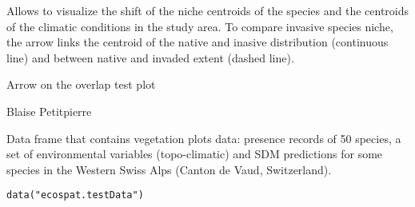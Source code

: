 \documentclass[a4paper]{book}
\begin{document}
%
\begin{Details}\relax
Allows to visualize the shift of the niche centroids of the species and the centroids of the climatic conditions in the study area. To compare invasive species niche, the arrow links the centroid of the native and inasive distribution (continuous line) and between native and invaded extent (dashed line). 
\end{Details}
%
\begin{Value}
Arrow on the overlap test plot
\end{Value}
%
\begin{Author}\relax
Blaise Petitpierre 
\end{Author}
%
\begin{Description}\relax
Data frame that contains vegetation plots data: presence records of 50 species, a set of environmental variables (topo-climatic) and SDM predictions for some species in the Western Swiss Alps (Canton de Vaud, Switzerland).
\end{Description}
%
\begin{Usage}
\begin{verbatim}
data("ecospat.testData")
\end{verbatim}
\end{Usage}
%
\end{document}
